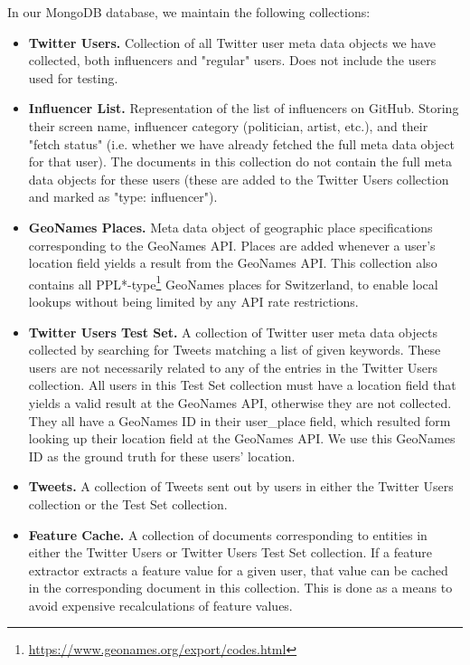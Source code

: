 \documentclass[10pt,a4paper]{article}
\begin{document}
In our MongoDB database, we maintain the following collections:
\begin{itemize}
\item \textbf{Twitter Users.} Collection of all Twitter user meta data objects we have collected, both influencers and "regular" users. Does not include the users used for testing.
\item \textbf{Influencer List.} Representation of the list of influencers on GitHub. Storing their screen name, influencer category (politician, artist, etc.), and their "fetch status" (i.e. whether we have already fetched the full meta data object for that user). The documents in this collection do not contain the full meta data objects for these users (these are added to the Twitter Users collection and marked as "type: influencer").
\item \textbf{GeoNames Places.} Meta data object of geographic place specifications corresponding to the GeoNames API. Places are added whenever a user's location field yields a result from the GeoNames API. This collection also contains all PPL*-type\footnote{\href{https://www.geonames.org/export/codes.html}{https://www.geonames.org/export/codes.html}}  GeoNames places for Switzerland, to enable local lookups without being limited by any API rate restrictions.
\item \textbf{Twitter Users Test Set.} A collection of Twitter user meta data objects collected by searching for Tweets matching a list of given keywords. These users are not necessarily related to any of the entries in the Twitter Users collection. All users in this Test Set collection must have a location field that yields a valid result at the GeoNames API, otherwise they are not collected. They all have a GeoNames ID in their user\_place field, which resulted form looking up their location field at the GeoNames API. We use this GeoNames ID as the ground truth for these users' location.
\item \textbf{Tweets.} A collection of Tweets sent out by users in either the Twitter Users collection or the Test Set collection. 
\item \textbf{Feature Cache.} A collection of documents corresponding to entities in either the Twitter Users or Twitter Users Test Set collection. If a feature extractor extracts a feature value for a given user, that value can be cached in the corresponding document in this collection. This is done as a means to avoid expensive recalculations of feature values.
\end{itemize}
\end{document}
